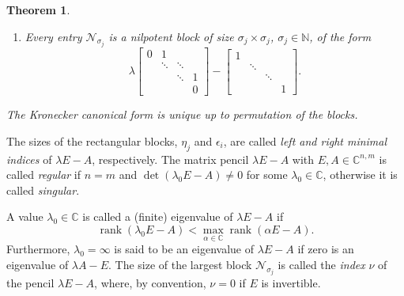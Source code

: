 \documentclass[11pt]{article}
\newtheorem{theorem}{Theorem}
\begin{document}
\begin{theorem}
\begin{enumerate}
\[\begin{array}{cccc}
1\\&\ddots\\&&\ddots\\&&&1
\end{array}\right]-
\left[\begin{array}{cccc}
\lambda_j&1\\&\ddots&\ddots\\&&\ddots&1\\&&&\lambda_j
\end{array}\right].
\]
\item[\rm (iv)]
Every entry ${\mathcal N}_{\sigma_j}$ is a nilpotent block of size
${\sigma_j}\times {\sigma_j}$, $\sigma_j\in{\mathbb N}$,
of the form
\[
\lambda\left[\begin{array}{cccc}
0&1\\&\ddots&\ddots\\&&\ddots&1\\&&&0
\end{array}\right]-
\left[\begin{array}{cccc}
1\\&\ddots\\&&\ddots\\&&&1
\end{array}\right].
\]
\end{enumerate}
%
The Kronecker canonical form is unique up to permutation of the blocks.%
\end{theorem}
%
The sizes of the rectangular blocks, $\eta_j$ and $\epsilon_i$,
are called \emph{left and right minimal indices} of $\lambda E-A$, respectively. The matrix pencil $\lambda E-A$ with $E,A\in\mathbb C^{n,m}$ is called \emph{regular} if $n=m$ and
$\operatorname{det}(\lambda_0 E-A)\neq 0$ for some $\lambda_0 \in \mathbb C$,
otherwise it is called \emph{singular}.


A value $\lambda_0\in\mathbb C$ is called a (finite) eigenvalue of $\lambda E-A$ if
%
\[
\operatorname{rank}(\lambda_0E-A)<\max_{\alpha\in\mathbb C}
\operatorname{rank}(\alpha E-A).
\]
Furthermore,
$\lambda_0=\infty$ is said to be an eigenvalue of $\lambda E-A$ if zero is an eigenvalue of $\lambda A-E$.
The size of the largest block ${\mathcal N}_{\sigma_j}$ is
called the \emph{index} $\nu$ of the pencil $\lambda E-A$, where, by convention,  $\nu=0$ if $E$ is invertible.
\end{document}
